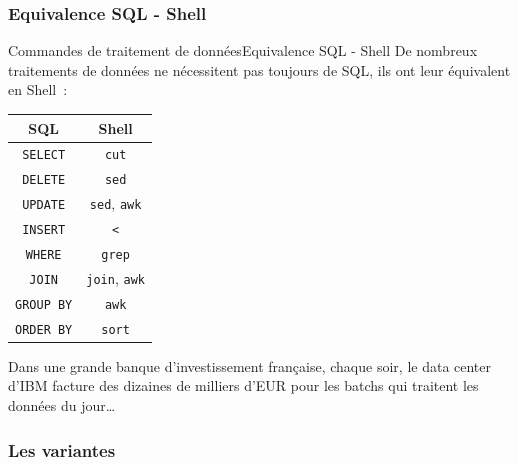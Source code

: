 \documentclass{beamer}
\begin{document}
    \subsubsection{Equivalence SQL - Shell}\label{subsubsec:equi-sql-shell}
    \begin{frame}{Commandes de traitement de données}{Equivalence SQL - Shell}
        De nombreux traitements de données ne nécessitent pas toujours de SQL, ils ont leur équivalent en Shell~:
        \begin{table}[ht]
            \centering
            \begin{tabular}{|c|c|}
                \hline
                \textbf{SQL}         & \textbf{Shell}                    \\
                \hline
                \lstinline{SELECT}   & \lstinline{cut}                   \\
                \hline
                \lstinline{DELETE}   & \lstinline{sed}                   \\
                \hline
                \lstinline{UPDATE}   & \lstinline{sed}, \lstinline{awk}  \\
                \hline
                \lstinline{INSERT}   & \lstinline{<}                     \\
                \hline
                \lstinline{WHERE}    & \lstinline{grep}                  \\
                \hline
                \lstinline{JOIN}     & \lstinline{join}, \lstinline{awk} \\
                \hline
                \lstinline{GROUP BY} & \lstinline{awk}                   \\
                \hline
                \lstinline{ORDER BY} & \lstinline{sort}                  \\
                \hline
            \end{tabular}
        \end{table}
        Dans une grande banque d'investissement française, chaque soir, le data center d'IBM facture des dizaines de milliers d'EUR pour les batchs qui traitent les données du jour\ldots
    \end{frame}

    \subsubsection{Les variantes}\label{subsubsec:variantes}
\end{document}
